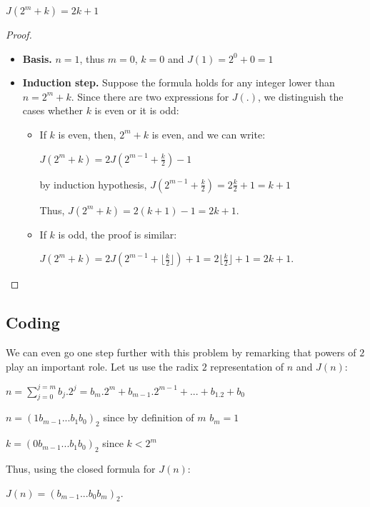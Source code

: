 {\begin{prop}
$J(2^m+k) = 2k+1$ 
\end{prop}

\begin{proof}
\begin{itemize}
\item {\bf Basis.} 
$n=1$, thus $m=0$, $k=0$ and $J(1) = 2^0+0 = 1$
\item {\bf Induction step.} 
Suppose the formula holds for any integer lower than $n=2^m+k$. 
Since there are two expressions for $J(.)$, we distinguish the cases whether $k$ is even or it is odd:
\begin{itemize}
\item If $k$ is even, then, $2^m+k$ is even, and we can write:

$J(2^m+k) = 2J(2^{m-1}+\frac{k}{2})-1$

by induction hypothesis, $J(2^{m-1} +\frac{k}{2}) = 2\frac{k}{2} +1 = k+1$

Thus, $J(2^m+k) = 2(k+1) -1 = 2k+1$.

\item If $k$ is odd, the proof is similar:

$J(2^m+k) = 2J(2^{m-1}+\lfloor \frac{k}{2} \rfloor)+1 = 2\lfloor \frac{k}{2} \rfloor +1 = 2k+1$.

\end{itemize}
\end{itemize}
\end{proof}

\subsection{Coding}

We can even go one step further with this problem by remarking that powers of $2$ play an important role.
Let us use the radix $2$ representation of $n$ and $J(n)$:

$n = \sum_{j=0}^{j=m} b_j.2^j = b_m.2^m + b_{m-1}.2^{m-1} + ... + b_1.2 + b_0$

$n = (1 b_{m-1} ... b_1 b_0)_2$ since by definition of $m$ $b_m=1$ 

$k = (0 b_{m-1} ... b_1 b_0)_2$ since $k < 2^m$

Thus, using the closed formula for $J(n)$:

$J(n) = (b_{m-1} ... b_0 b_m)_2$.

}
